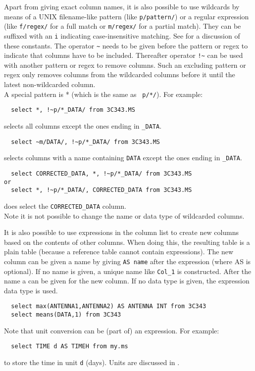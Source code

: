 Apart from giving exact column names, it is also possible to use
wildcards by means of a UNIX filename-like pattern (like \texttt{p/pattern/})
or a regular expression (like \texttt{f/regex/} for a full match or
\texttt{m/regex/} for a partial match). They can be suffixed with an
\texttt{i} indicating case-insensitive matching.
See  for a discussion of these constants.
The operator \verb+~+ needs to be given before the pattern or regex
to indicate that columns have to be included. Thereafter operator
\verb+!~+ can be used with another pattern or regex to remove columns.
Such an excluding pattern or regex only removes columns from the
wildcarded columns before it until the latest non-wildcarded column.
\\A special pattern is * (which is the same as \texttt{~p/*/}).
 For example:
\begin{verbatim}
  select *, !~p/*_DATA/ from 3C343.MS
\end{verbatim}
selects all columns except the ones ending in \texttt{\_DATA}.
\begin{verbatim}
  select ~m/DATA/, !~p/*_DATA/ from 3C343.MS
\end{verbatim}
selects columns with a name containing \texttt{DATA} except the ones
ending in \texttt{\_DATA}.
\begin{verbatim}
  select CORRECTED_DATA, *, !~p/*_DATA/ from 3C343.MS
or
  select *, !~p/*_DATA/, CORRECTED_DATA from 3C343.MS
\end{verbatim}
does select the \texttt{CORRECTED\_DATA} column.
\\Note it is not possible to change the name or data type of
wildcarded columns.

It is also possible to use expressions in the column list to create
new columns based on the contents of other columns. When doing this,
the resulting table is a plain table (because a reference table
cannot contain expressions). The new column can be given a name
by giving \texttt{AS name} after the expression (where AS is
optional). If no name is given, a unique name like
\texttt{Col\_1} is constructed.
After the name a  can
be given for the new column. If no data type is given, the expression
data type is used.
\begin{verbatim}
  select max(ANTENNA1,ANTENNA2) AS ANTENNA INT from 3C343
  select means(DATA,1) from 3C343
\end{verbatim}
Note that unit conversion can be (part of) an expression. For example:
\begin{verbatim}
  select TIME d AS TIMEH from my.ms
\end{verbatim}
to store the time in unit \texttt{d} (days). Units are discussed in
.

